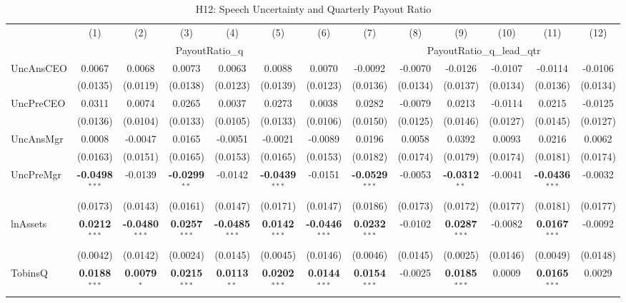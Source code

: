 \documentclass[11pt,a4paper]{article}
\begin{document}
\clearpage
\begin{table}[htbp]
\centering
\caption{H12: Speech Uncertainty and Quarterly Payout Ratio}
\label{tab:h12}
\scriptsize
\begin{tabular}{lcccccccccccc}
\toprule
 & (1) & (2) & (3) & (4) & (5) & (6) & (7) & (8) & (9) & (10) & (11) & (12) \\
 & \multicolumn{6}{c}{PayoutRatio\_q} & \multicolumn{6}{c}{PayoutRatio\_q\_lead\_qtr} \\
\cmidrule(lr){2-7} \cmidrule(lr){8-13}
\midrule
UncAnsCEO & 0.0067 & 0.0068 & 0.0073 & 0.0063 & 0.0088 & 0.0070 & -0.0092 & -0.0070 & -0.0126 & -0.0107 & -0.0114 & -0.0106 \\
 & (0.0135) & (0.0119) & (0.0138) & (0.0123) & (0.0139) & (0.0123) & (0.0136) & (0.0134) & (0.0137) & (0.0134) & (0.0136) & (0.0134) \\
UncPreCEO & 0.0311 & 0.0074 & 0.0265 & 0.0037 & 0.0273 & 0.0038 & 0.0282 & -0.0079 & 0.0213 & -0.0114 & 0.0215 & -0.0125 \\
 & (0.0136) & (0.0104) & (0.0133) & (0.0105) & (0.0133) & (0.0106) & (0.0150) & (0.0125) & (0.0146) & (0.0127) & (0.0145) & (0.0127) \\
UncAnsMgr & 0.0008 & -0.0047 & 0.0165 & -0.0051 & -0.0021 & -0.0089 & 0.0196 & 0.0058 & 0.0392 & 0.0093 & 0.0216 & 0.0062 \\
 & (0.0163) & (0.0151) & (0.0165) & (0.0153) & (0.0165) & (0.0153) & (0.0182) & (0.0174) & (0.0179) & (0.0174) & (0.0181) & (0.0174) \\
UncPreMgr & \textbf{-0.0498}$^{***}$ & -0.0139 & \textbf{-0.0299}$^{**}$ & -0.0142 & \textbf{-0.0439}$^{***}$ & -0.0151 & \textbf{-0.0529}$^{***}$ & -0.0053 & \textbf{-0.0312}$^{**}$ & -0.0041 & \textbf{-0.0436}$^{***}$ & -0.0032 \\
 & (0.0173) & (0.0143) & (0.0161) & (0.0147) & (0.0171) & (0.0147) & (0.0186) & (0.0173) & (0.0172) & (0.0177) & (0.0181) & (0.0177) \\
\midrule
lnAssets & \textbf{0.0212}$^{***}$ & \textbf{-0.0480}$^{***}$ & \textbf{0.0257}$^{***}$ & \textbf{-0.0485}$^{***}$ & \textbf{0.0142}$^{***}$ & \textbf{-0.0446}$^{***}$ & \textbf{0.0232}$^{***}$ & -0.0102 & \textbf{0.0287}$^{***}$ & -0.0082 & \textbf{0.0167}$^{***}$ & -0.0092 \\
 & (0.0042) & (0.0142) & (0.0024) & (0.0145) & (0.0045) & (0.0146) & (0.0046) & (0.0145) & (0.0025) & (0.0146) & (0.0049) & (0.0148) \\
TobinsQ & \textbf{0.0188}$^{***}$ & \textbf{0.0079}$^{*}$ & \textbf{0.0215}$^{***}$ & \textbf{0.0113}$^{**}$ & \textbf{0.0202}$^{***}$ & \textbf{0.0144}$^{***}$ & \textbf{0.0154}$^{***}$ & -0.0025 & \textbf{0.0185}$^{***}$ & 0.0009 & \textbf{0.0165}$^{***}$ & 0.0029 \\

\end{tabular}
\end{table}
\end{document}
